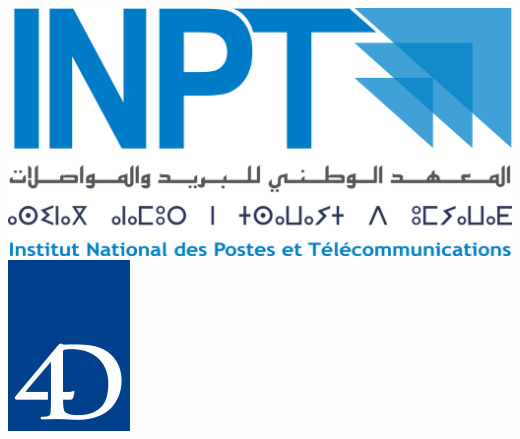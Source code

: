 
\thispagestyle{empty}
\includegraphics[scale=0.08]{Logos/Logo_INPT.png} 
         \hspace{12cm}  
         \includegraphics[scale=0.35]{Logos/Logo-4D.jpg}
        
